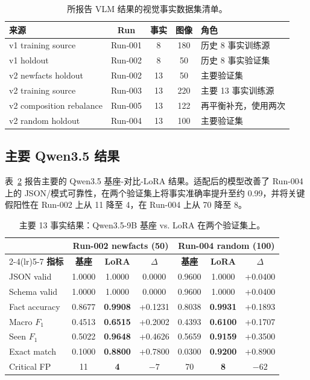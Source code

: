 \begin{table}[htbp]
\centering
\caption{所报告 VLM 结果的视觉事实数据集清单。}
\label{tab:dataset-summary}
\small
\begin{tabular}{@{}lcccl@{}}
\toprule
\textbf{来源} & \textbf{Run} & \textbf{事实} & \textbf{图像} & \textbf{角色} \\
\midrule
v1 training source & Run-001 & 8  & 180 & 历史 8 事实训练源 \\
v1 holdout & Run-002 & 8  & 50  & 历史 8 事实验证集 \\
v2 newfacts holdout & Run-002 & 13 & 50  & 主要验证集 \\
v2 training source & Run-003 & 13 & 220 & 主要 13 事实训练源 \\
v2 composition rebalance & Run-005 & 13 & 122 & 再平衡补充，使用两次 \\
v2 random holdout & Run-004 & 13 & 100 & 主要验证集 \\
\bottomrule
\end{tabular}
\end{table}

\subsection{主要 Qwen3.5 结果}

表~\ref{tab:qwen35-primary} 报告主要的 Qwen3.5 基座-对比-LoRA 结果。适配后的模型改善了 Run-004 上的 JSON/模式可靠性，在两个验证集上将事实准确率提升至约 0.99，并将关键假阳性在 Run-002 上从 11 降至 4，在 Run-004 上从 70 降至 8。

\begin{table}[htbp]
\centering
\caption{主要 13 事实结果：Qwen3.5-9B 基座 vs. LoRA 在两个验证集上。}
\label{tab:qwen35-primary}
\small
\begin{tabular}{@{}lccc ccc@{}}
\toprule
& \multicolumn{3}{c}{\textbf{Run-002 newfacts (50)}} & \multicolumn{3}{c}{\textbf{Run-004 random (100)}} \\
\cmidrule(lr){2-4}\cmidrule(lr){5-7}
\textbf{指标} & \textbf{基座} & \textbf{LoRA} & \textbf{$\Delta$} & \textbf{基座} & \textbf{LoRA} & \textbf{$\Delta$} \\
\midrule
JSON valid & 1.0000 & 1.0000 & 0.0000 & 0.9600 & 1.0000 & +0.0400 \\
Schema valid & 1.0000 & 1.0000 & 0.0000 & 0.9600 & 1.0000 & +0.0400 \\
Fact accuracy & 0.8677 & \textbf{0.9908} & +0.1231 & 0.8038 & \textbf{0.9931} & +0.1893 \\
Macro $F_1$ & 0.4513 & \textbf{0.6515} & +0.2002 & 0.4393 & \textbf{0.6100} & +0.1707 \\
Seen $F_1$ & 0.5022 & \textbf{0.9648} & +0.4626 & 0.5659 & \textbf{0.9159} & +0.3500 \\
Exact match & 0.1000 & \textbf{0.8800} & +0.7800 & 0.0300 & \textbf{0.9200} & +0.8900 \\
Critical FP & 11 & \textbf{4} & $-7$ & 70 & \textbf{8} & $-62$ \\
\bottomrule
\end{tabular}
\end{table}

